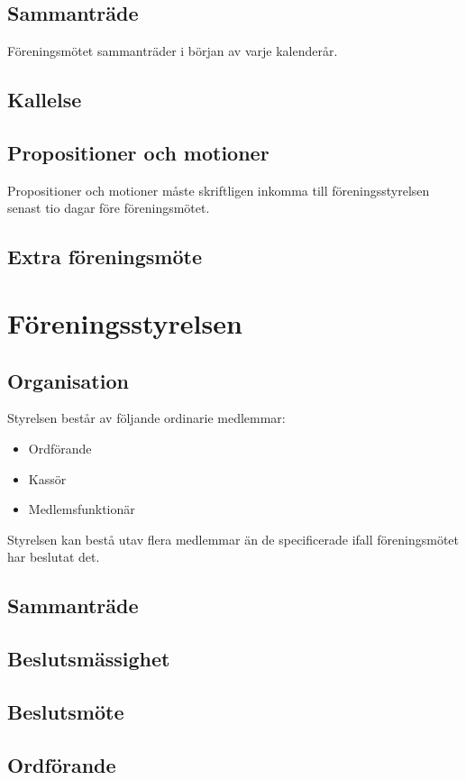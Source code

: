 \documentclass{article}
\begin{document}
\subsection{Sammanträde}
Föreningsmötet sammanträder i början av varje kalenderår.
\subsection{Kallelse}
\subsection{Propositioner och motioner}
Propositioner och motioner måste skriftligen inkomma till föreningsstyrelsen
senast tio dagar före föreningsmötet.
\subsection{Extra föreningsmöte}


\section{Föreningsstyrelsen}
\subsection{Organisation}
Styrelsen består av följande ordinarie medlemmar:
\begin{itemize}
  \item Ordförande
  \item Kassör
  \item Medlemsfunktionär
\end{itemize}
Styrelsen kan bestå utav flera medlemmar än de specificerade ifall föreningsmötet har
beslutat det.

\subsection{Sammanträde}

\subsection{Beslutsmässighet}

\subsection{Beslutsmöte}

\subsection{Ordförande}
\end{document}
